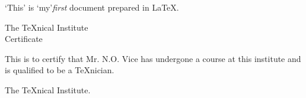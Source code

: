 \documentclass{article}
\begin{document}
`This' is \lq my\rq \emph{first} document prepared in \LaTeX.
\begin{center}
The \TeX nical Institute\\[.75cm]
Certificate
\end{center}
\noindent This is to certify that Mr. N.O. Vice has undergone a course at this institute and is qualified to be a \TeX nician.
\begin{flushright}
The \TeX nical Institute.
\end{flushright}
\end{document}
